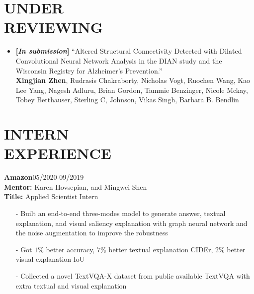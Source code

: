 \documentclass[margin]{res}
\begin{document}
\begin{resume}
\section{UNDER\\ REVIEWING}
				\begin{itemize}[noitemsep,wide=0pt,leftmargin=\dimexpr{} + 2\relax]\itemsep -0.0pt
				\item \textbf{[\emph{In submission}]} ``Altered Structural Connectivity Detected with Dilated Convolutional Neural Network Analysis in the DIAN study and the Wisconsin Registry for Alzheimer's Prevention.''\\
                            \textbf{Xingjian Zhen}, Rudrasis Chakraborty, Nicholas Vogt, Ruochen Wang, Kao Lee Yang, Nagesh Adluru, Brian Gordon, Tammie Benzinger, Nicole Mckay, Tobey Betthauser, Sterling C, Johnson, Vikas Singh, Barbara B. Bendlin
                \end{itemize}

\vspace{-1em}
\section{INTERN \\ EXPERIENCE}
                \textbf{Amazon}\hfill 05/2020-09/2019\\
                \textbf{Mentor:} Karen Hovsepian, and Mingwei Shen\\
                \textbf{Title:} Applied Scientist Intern
                \begin{itemize}\itemsep -2.2pt %
                \item[-] Built an end-to-end three-modes model to generate answer, textual explanation, and visual saliency explanation with graph neural network and the noise augmentation to improve the robustness
                \item[-] Got $1\%$ better accuracy, $7\%$ better textual explanation CIDEr, $2\%$ better visual explanation IoU
                 \item[-] Collected a novel TextVQA-X dataset from public available TextVQA with extra textual and visual explanation
                 \end{itemize}
                

\end{resume}
\end{document}
